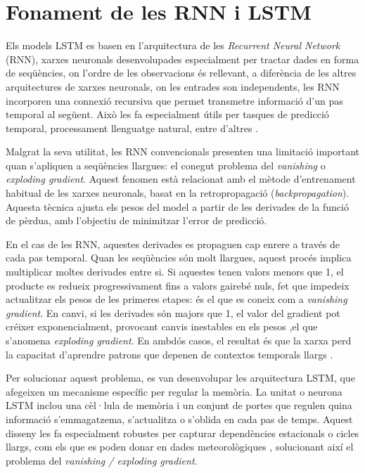 \documentclass[../main.tex]{subfiles}
\begin{document}
\section{Fonament de les RNN i LSTM}

Els models LSTM es basen en l'arquitectura de les \textit{Recurrent Neural Network} (RNN), xarxes neuronals desenvolupades especialment per tractar dades en forma de seqüències, on l'ordre de les observacions és rellevant, a diferència de les altres arquitectures de xarxes neuronals, on les entrades son independents, les RNN incorporen una connexió recursiva que permet transmetre informació d'un pas temporal al següent. Això les fa especialment útils per tasques de predicció temporal, processament llenguatge natural, entre d'altres \parencite{lim2021time}.

Malgrat la seva utilitat, les RNN convencionals presenten una limitació important quan s’apliquen a seqüències llargues: el conegut problema del \textit{vanishing} o \textit{exploding gradient}. Aquest fenomen està relacionat amb el mètode d’entrenament habitual de les xarxes neuronals, basat en la retropropagació (\textit{backpropagation}). Aquesta tècnica ajusta els pesos del model a partir de les derivades de la funció de pèrdua, amb l’objectiu de minimitzar l’error de predicció.

En el cas de les RNN, aquestes derivades es propaguen cap enrere a través de cada pas temporal. Quan les seqüències són molt llargues, aquest procés implica multiplicar moltes derivades entre si. Si aquestes tenen valors menors que 1, el producte es redueix progressivament fins a valors gairebé nuls, fet que impedeix actualitzar els pesos de les primeres etapes: és el que es coneix com a \textit{vanishing gradient}. En canvi, si les derivades són majors que 1, el valor del gradient pot créixer exponencialment, provocant canvis inestables en els pesos ,el que s’anomena \textit{exploding gradient}. En ambdós casos, el resultat és que la xarxa perd la capacitat d’aprendre patrons que depenen de contextos temporals llargs \cite{lim2021time,de2020comparison}.

Per solucionar aquest problema, es van desenvolupar les arquitectura LSTM, que afegeixen un mecanisme específic per regular la memòria. La unitat o neurona LSTM inclou una cèl·lula de memòria i un conjunt de portes que regulen quina informació s’emmagatzema, s’actualitza o s’oblida en cada pas de temps. Aquest disseny les fa especialment robustes per capturar dependències estacionals o cicles llargs, com els que es poden donar en dades meteorològiques \cite{tugal2023analysis}, solucionant així el problema del \textit{vanishing / exploding gradient}.
\end{document}
